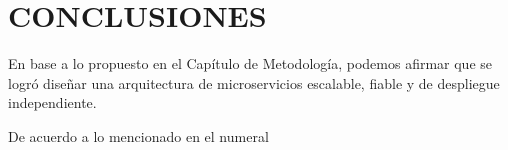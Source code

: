 \section{CONCLUSIONES}

En base a lo propuesto en el Capítulo de Metodología, podemos afirmar que se logró
diseñar una arquitectura de microservicios escalable, fiable y de despliegue independiente.

De acuerdo a lo mencionado en el numeral 
